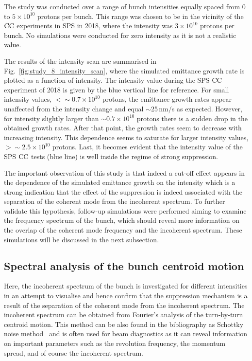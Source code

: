  The study was conducted over a range of bunch intensities equally spaced from 0 to $5 \times 10^{10}$ protons per bunch. This range was chosen to be in the vicinity of the ${\mathrm{CC}}$ experiments in SPS in 2018, where the intensity was $3 \times 10^{10}$ protons per bunch. No simulations were conducted for zero intensity as it is not a realistic value.

 The results of the intensity scan are summarised in Fig.~\ref{fig:study_8_intensity_scan}, where the simulated emittance growth rate is plotted as a function of intensity. The intensity value during the SPS ${\mathrm{CC}}$ experiment of 2018 is given by the blue vertical line for reference. For small intensity values, $< \sim 0.7\times 10^{10}$ protons, the emittance growth rates appear unaffected from the intensity change and equal $\sim$25\,nm/s as expected. However, for intensity slightly larger than $\sim 0.7 \times 10^{10}$ protons there is a sudden drop in the obtained growth rates. After that point, the growth rates seem to decrease with increasing intensity. This dependence seems to saturate for larger intensity values, $>\sim 2.5 \times 10^{10}$ protons. Last, it becomes evident that the intensity value of the SPS ${\mathrm{CC}}$ tests (blue line) is well inside the regime of strong suppression.

The important observation of this study is that indeed a cut-off effect appears in the dependence of the simulated emittance growth on the intensity which is a strong indication that the effect of the suppression is indeed associated with the separation of the coherent mode from the incoherent spectrum. To further validate this hypothesis, follow-up simulations were performed aiming to examine the frequency spectrum of the bunch, which should reveal more information on the overlap of the coherent mode frequency and the incoherent spectrum. These simulations will be discussed in the next subsection.



\subsection{Spectral analysis of the bunch centroid motion}\label{subsec:spectral_analysis_schottky}
Here, the incoherent spectrum of the bunch is investigated for different intensities in an attempt to visualise and hence confirm that the suppression mechanism is a result of the separation of the coherent mode from the incoherent spectrum. The incoherent spectrum can be obtained from Fourier's analysis of the turn-by-turn centroid motion. This method can be also found in the bibliography as Schottky noise method~\cite{Caspers:1213284} and is often used for beam diagnostics as it can reveal information on important parameters such as the revolution frequency, the momentum spread, and of course the incoherent spectrum.

